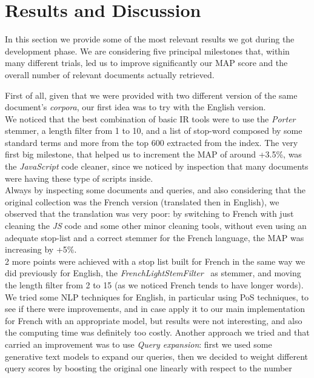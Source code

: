 
\section{Results and Discussion}

\label{sec:results}


In this section we provide some of the most relevant results we got during the development phase.
We are considering five principal milestones that, within many different trials, led us to improve significantly our \ac{MAP} score and the overall number of relevant documents actually retrieved.

First of all, given that we were provided with two different version of the same document's \textit{corpora}, our first idea was to try with the English version.\\ 
We noticed that the best combination of basic \ac{IR} tools were to use the \textit{Porter} stemmer, a length filter from 1 to 10, and a list of stop-word composed by some standard terms and more from the top 600 extracted from the index.
The very first big milestone, that helped us to increment the \ac{MAP} of around +3.5\%, was the \textit{JavaScript} code cleaner, since we noticed by inspection that many documents were having these type of scripts inside.\\
Always by inspecting some documents and queries, and also considering that the original collection was the French version (translated then in English), we observed that the translation was very poor: by switching to French
with just cleaning the \textit{JS} code and some other minor cleaning tools, without even using an adequate stop-list and a correct stemmer for the French language, the \ac{MAP} was increasing by +5\%. \\
2 more points were achieved with a stop list built for French in the same way we did previously for English, the \textit{FrenchLightStemFilter}~\cite{solrfrenchlightstemfilter} as stemmer, and moving the length filter from 2 to 15 (as we noticed French tends to have longer words). \\
We tried some \ac{NLP} techniques for English, in particular using \ac{PoS} techniques, to see if there were improvements, and in case apply it to our main implementation for French with an appropriate model, but results
were not interesting, and also the computing time was definitely too costly.
Another approach we tried and that carried an improvement was to use \textit{Query expansion}: first we used some generative text models to expand our queries, then we decided to weight different query scores by boosting the original one linearly with respect to the number

